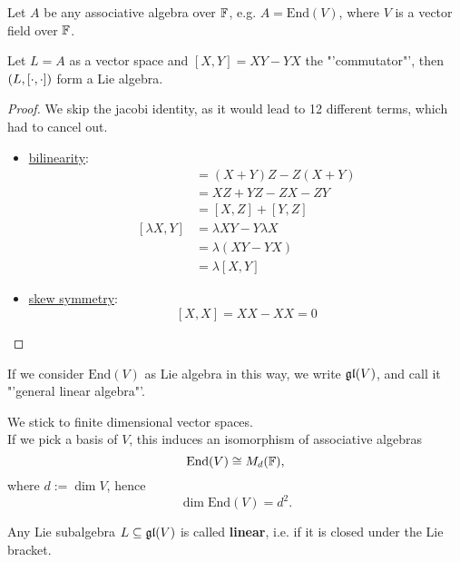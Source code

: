 \begin{example}
    Let $A$ be any associative algebra over $\mathbb{F}$, e.g. $A = \textrm{End}(V)$, 
    where $V$ is a vector field over $\mathbb{F}$.

    Let $L = A$ as a vector space and $[X,Y] = XY -YX$ the "'commutator"', 
    then $(L, [\cdot,\cdot])$ form a Lie algebra.
\end{example}
\begin{proof} We skip the jacobi identity, as it would lead to 12 different terms, which had to cancel out.
    \begin{itemize}
        \item \underline{bilinearity}:
        \begin{align*}
            [X + Y, Z] &= (X + Y)Z - Z(X + Y) \\
                       &= XZ + YZ - ZX - ZY \\
                       &= [X,Z] + [Y,Z] \\
            [\lambda X, Y] &= \lambda XY - Y\lambda X \\
                           &= \lambda (XY -YX) \\
                           &= \lambda [X,Y]
        \end{align*}

        \item \underline{skew symmetry}:
        $$ [X,X] = XX - XX = 0 $$
    \end{itemize}
\end{proof}

\begin{definition}
    If we consider $\textrm{End}(V)$ as Lie algebra in this way, we write $\mathfrak{gl} (V)$, and call it
    "'general linear algebra"'.
\end{definition}

\begin{remark}
    We stick to finite dimensional vector spaces.\\
    If we pick a basis of $V$, this induces an isomorphism of associative algebras
    $$ \textrm{End}(V) \cong M_d(\mathbb{F}), $$ where $d := \dim V$, 
    hence
    $$ \dim \textrm{End}(V) = d^2. $$
\end{remark}

\begin{definition}
    Any Lie subalgebra $L \subseteq \mathfrak{gl}(V)$ is called \textbf{linear}, i.e.
    if it is closed under the Lie bracket. 
\end{definition}


